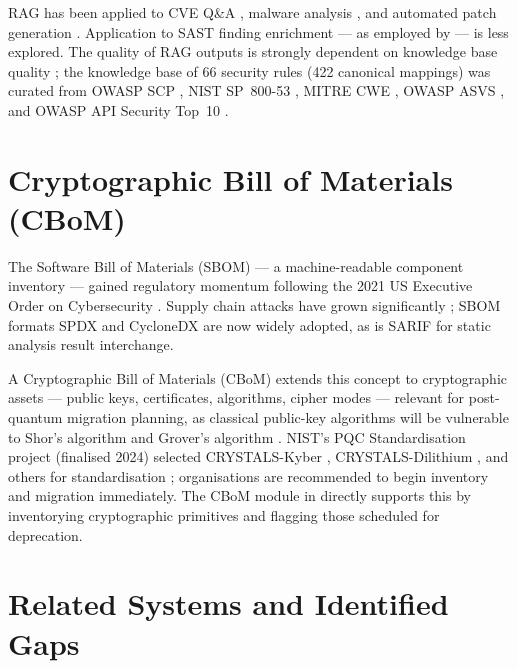 RAG has been applied to CVE Q\&A \cite{chatsec2024}, malware analysis \cite{securityllm2024}, and automated patch generation \cite{zhang2024autocoderover}. Application to SAST finding enrichment --- as employed by \ACRQA{} --- is less explored. The quality of RAG outputs is strongly dependent on knowledge base quality \cite{guu2020retrieval}; the \ACRQA{} knowledge base of 66 security rules (422 canonical mappings) was curated from OWASP SCP \cite{owasp_scp}, NIST SP~800-53 \cite{nist_800_53}, MITRE CWE \cite{mitre_cwe}, OWASP ASVS \cite{owasp_asvs}, and OWASP API Security Top~10 \cite{owasp_api_top10}.

\section{Cryptographic Bill of Materials (CBoM)}
\label{sec:cbom_background}

The Software Bill of Materials (SBOM) --- a machine-readable component inventory --- gained regulatory momentum following the 2021 US Executive Order on Cybersecurity \cite{white_house_eo_2021}. Supply chain attacks have grown significantly \cite{ladisa2023sok}; SBOM formats SPDX \cite{spdx_standard} and CycloneDX \cite{cyclonedx} are now widely adopted, as is SARIF \cite{sarif_standard} for static analysis result interchange.

A Cryptographic Bill of Materials (CBoM) extends this concept to cryptographic assets --- public keys, certificates, algorithms, cipher modes --- relevant for post-quantum migration planning, as classical public-key algorithms will be vulnerable to Shor's algorithm \cite{shor1994algorithms} and Grover's algorithm \cite{grover1996fast}. NIST's PQC Standardisation project (finalised 2024) \cite{nist_pqc_2024} selected CRYSTALS-Kyber \cite{nist_fips_203}, CRYSTALS-Dilithium \cite{nist_fips_204}, and others for standardisation \cite{nist_fips_197}; organisations are recommended to begin inventory and migration immediately. The CBoM module in \ACRQA{} directly supports this by inventorying cryptographic primitives and flagging those scheduled for deprecation.

\section{Related Systems and Identified Gaps}
\label{sec:related_tools}

